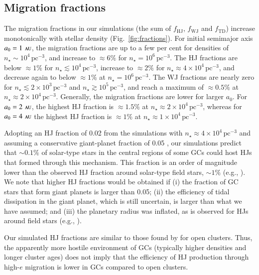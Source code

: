 \documentclass[iop,usenatbib]{emulateapj}
\newcommand{\au}{\,\textsc{au}}
\begin{document}
\subsection{Migration fractions}
\label{sect:discussion:migr_fr}
The migration fractions in our simulations (the sum of $f_\mathrm{HJ}$, $f_\mathrm{WJ}$ and $f_\mathrm{TD}$) increase monotonically with stellar density (Fig.~\ref{fig:fractions}). For initial semimajor axis $a_0=1\,\au$, the migration fractions are up to a few per cent for densities of $n_\star \sim 10^4 \, \mathrm{pc^{-3}}$, and increase to $\approx 6\%$ for $n_\star=10^6\,\mathrm{pc^{-3}}$. The HJ fractions are below $\approx 1\%$ for $n_\star \lesssim 10^4\,\mathrm{pc^{-3}}$,  increase to $\approx 2\%$ for $n_\star \approx 4\times 10^4\,\mathrm{pc^{-3}}$, and decrease again to below $\approx 1\%$ at $n_\star=10^6\,\mathrm{pc^{-3}}$. The WJ fractions are nearly zero for $n_\star \lesssim 2 \times 10^3\,\mathrm{pc^{-3}}$ and $n_\star \gtrsim 10^5\,\mathrm{pc^{-3}}$, and reach a maximum of $\approx 0.5\%$ at $n_\star \approx 2\times 10^4\,\mathrm{pc^{-3}}$. Generally, the migration fractions are lower for larger $a_0$. For $a_0=2 \, \au$, the highest HJ fraction is $\approx 1.5\%$ at $n_\star \approx 2\times 10^4\,\mathrm{pc^{-3}}$, whereas for $a_0=4\,\au$ the highest HJ fraction is $\approx 1\%$ at $n_\star \approx 1\times 10^4\,\mathrm{pc^{-3}}$.

Adopting an HJ fraction of 0.02 from the simulations with $n_\star \approx 4\times 10^4\,\mathrm{pc^{-3}}$ and assuming a conservative giant-planet fraction of 0.05 \citep{2008PASP..120..531C}, our simulations predict that $\sim 0.1\%$ of solar-type stars in the central regions of some GCs could host HJs that formed through this mechanism. This fraction is an order of magnitude lower than the observed HJ fraction around solar-type field stars, $\sim 1\%$ (e.g., \citealt{2012ApJ...753..160W}). We note that higher HJ fractions would be obtained if (i) the fraction of GC stars that form giant planets is larger than 0.05; (ii) the efficiency of tidal dissipation in the giant planet, which is still uncertain, is larger than what we have assumed; and (iii) the planetary radius was inflated, as is observed for HJs around field stars (e.g., \citealt{2011ApJ...729L...7L}). 

Our simulated HJ fractions are similar to those found by \citet{2016ApJ...816...59S} for open clusters. Thus, the apparently more hostile environment of GCs (typically higher densities and longer cluster ages) does not imply that the efficiency of HJ production through high-$e$ migration is lower in GCs compared to open clusters.
\end{document}

